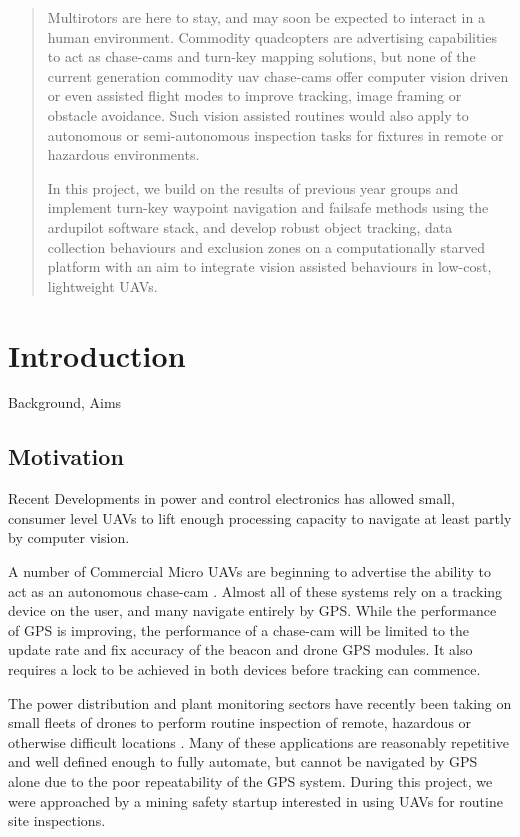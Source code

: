 \documentclass[a4paper, 11pt, titlepage]{article}
\begin{document}
  

  \begin{abstract}
  Multirotors are here to stay, and may soon be expected to interact in a human environment.
  Commodity quadcopters are advertising capabilities to act as  chase-cams and turn-key mapping solutions, but none of the current generation commodity uav chase-cams offer computer vision driven or even assisted flight modes to improve tracking, image framing or obstacle avoidance.  Such vision assisted routines would also apply to autonomous or semi-autonomous inspection tasks for fixtures in remote or hazardous environments.

  In this project, we build on the results of previous year groups and implement turn-key waypoint navigation and failsafe methods using the ardupilot software stack, and develop robust object tracking, data collection behaviours and exclusion zones on a computationally starved platform with an aim to integrate vision assisted behaviours in low-cost, lightweight UAVs.
  \end{abstract}

  \tableofcontents
  \pagebreak
  \section{Introduction}
    Background, Aims

    \subsection{Motivation}
      Recent Developments in power and control electronics has allowed small, consumer level UAVs to lift enough processing capacity to navigate at least partly by computer vision.

      A number of Commercial Micro UAVs are beginning to advertise the ability to act as an autonomous chase-cam \cite{Lily} \cite{AirDog}.  Almost all of these systems rely on a tracking device on the user, and many navigate entirely by GPS.  While the performance of GPS is improving, the performance of a chase-cam will be limited to the update rate and fix accuracy of the beacon and drone GPS modules.  It also requires a lock to be achieved in both devices before tracking can commence.

      The power distribution and plant monitoring sectors have recently been taking on small fleets of drones to perform routine inspection of remote, hazardous or otherwise difficult locations \cite{RopeAccess}.  Many of these applications are reasonably repetitive and well defined enough to fully automate, but cannot be navigated by GPS alone due to the poor repeatability of the GPS system.
      During this project, we were approached by a mining safety startup interested in using UAVs for routine site inspections.
\end{document}

